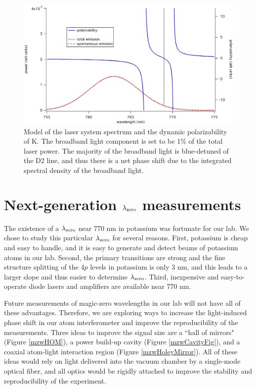 \begin{figure}
\centerline{\includegraphics[width=.9\textwidth]{Figures/ASEmodelSpectrum2.pdf}}
\caption[Plot of the laser spectrum and the dynamic polarizability of potassium.]{\label{mzwSponSpectrum}Model of the laser system spectrum and the dynamic polarizability of K. The  broadband light component is set to be 1\% of the total laser power. The majority of the broadband light is blue-detuned of the D2 line, and thus there is a net phase shift due to the integrated spectral density of the broadband light.}
\end{figure}




\section{Next-generation $\lambda_\textrm{zero}$ measurements}
\label{mzwNextGenSec}
The existence of a $\lambda_\textrm{zero}$ near 770 nm in potassium was fortunate for our lab. We chose to study this particular $\lambda_\textrm{zero}$ for several reasons. First, potassium is cheap and easy to handle, and it is easy to generate and detect beams of potassium atoms in our lab. Second, the primary transitions are strong and the fine structure splitting of the $4p$ levels in potassium is only 3 nm, and this leads to a larger slope and thus easier to determine $\lambda_\textrm{zero}$. Third, inexpensive and easy-to-operate diode lasers and amplifiers are available near 770 nm.

Future measurements of magic-zero wavelengths in our lab will not have all of these advantages. Therefore, we are exploring ways to increase the light-induced phase shift in our atom interferometer and improve the reproducibility of the measurements. Three ideas to improve the signal size are a ``hall of mirrors" (Figure \ref{mzwHOM}), a power build-up cavity (Figure \ref{mzwCavityFig}), and a coaxial atom-light interaction region (Figure \ref{mzwHoleyMirror}). All of these ideas would rely on light delivered into the vacuum chamber by a single-mode optical fiber, and all optics would be rigidly attached to improve the stability and reproducibility of the experiment. 

